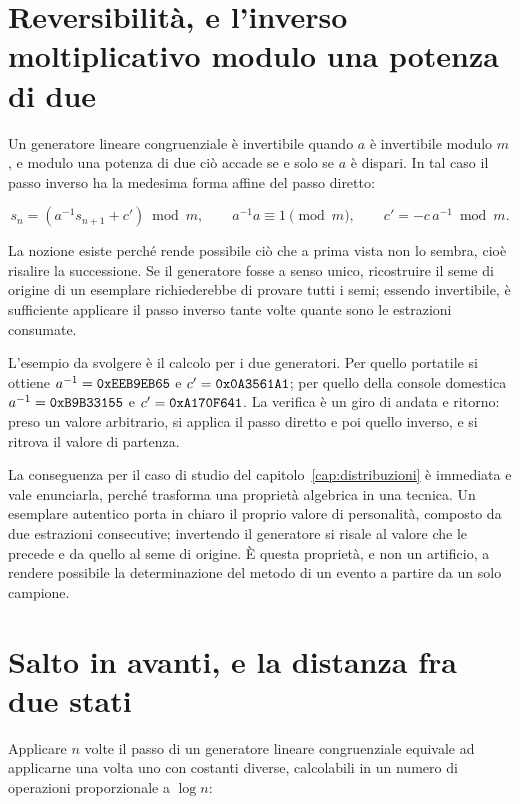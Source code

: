 \section{Reversibilità, e l'inverso moltiplicativo modulo una potenza di due}

Un generatore lineare congruenziale è invertibile quando $a$ è invertibile modulo $m$, e modulo una potenza di due ciò accade se e solo se $a$ è dispari. In tal caso il passo inverso ha la medesima forma affine del passo diretto:

\begin{equation}
s_n = (a^{-1} s_{n+1} + c') \bmod m, \qquad a^{-1} a \equiv 1 \pmod m, \qquad c' = -c\,a^{-1} \bmod m .
\end{equation}

La nozione esiste perché rende possibile ciò che a prima vista non lo sembra, cioè risalire la successione. Se il generatore fosse a senso unico, ricostruire il seme di origine di un esemplare richiederebbe di provare tutti i semi; essendo invertibile, è sufficiente applicare il passo inverso tante volte quante sono le estrazioni consumate.

L'esempio da svolgere è il calcolo per i due generatori. Per quello portatile si ottiene $a^{-1} = \texttt{0xEEB9EB65}$ e $c' = \texttt{0x0A3561A1}$; per quello della console domestica $a^{-1} = \texttt{0xB9B33155}$ e $c' = \texttt{0xA170F641}$. La verifica è un giro di andata e ritorno: preso un valore arbitrario, si applica il passo diretto e poi quello inverso, e si ritrova il valore di partenza.

La conseguenza per il caso di studio del capitolo~\ref{cap:distribuzioni} è immediata e vale enunciarla, perché trasforma una proprietà algebrica in una tecnica. Un esemplare autentico porta in chiaro il proprio valore di personalità, composto da due estrazioni consecutive; invertendo il generatore si risale al valore che le precede e da quello al seme di origine. È questa proprietà, e non un artificio, a rendere possibile la determinazione del metodo di un evento a partire da un solo campione.

\section{Salto in avanti, e la distanza fra due stati}

Applicare $n$ volte il passo di un generatore lineare congruenziale equivale ad applicarne una volta uno con costanti diverse, calcolabili in un numero di operazioni proporzionale a $\log n$:


